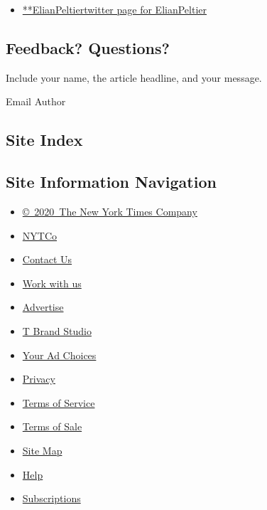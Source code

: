 \begin{itemize}
\tightlist
\item
  \href{https://twitter.com/ElianPeltier}{**ElianPeltiertwitter page for
  ElianPeltier}
\end{itemize}

\hypertarget{feedback-questions}{%
\subsection{Feedback? Questions?}\label{feedback-questions}}

Include your name, the article headline, and your message.

Email Author

\hypertarget{site-index}{%
\subsection{Site Index}\label{site-index}}

\hypertarget{site-information-navigation}{%
\subsection{Site Information
Navigation}\label{site-information-navigation}}

\begin{itemize}
\tightlist
\item
  \href{https://help.nytimes.com/hc/en-us/articles/115014792127-Copyright-notice}{©~2020~The
  New York Times Company}
\end{itemize}

\begin{itemize}
\tightlist
\item
  \href{https://www.nytco.com/}{NYTCo}
\item
  \href{https://help.nytimes.com/hc/en-us/articles/115015385887-Contact-Us}{Contact
  Us}
\item
  \href{https://www.nytco.com/careers/}{Work with us}
\item
  \href{https://nytmediakit.com/}{Advertise}
\item
  \href{http://www.tbrandstudio.com/}{T Brand Studio}
\item
  \href{https://www.nytimes.com/privacy/cookie-policy\#how-do-i-manage-trackers}{Your
  Ad Choices}
\item
  \href{https://www.nytimes.com/privacy}{Privacy}
\item
  \href{https://help.nytimes.com/hc/en-us/articles/115014893428-Terms-of-service}{Terms
  of Service}
\item
  \href{https://help.nytimes.com/hc/en-us/articles/115014893968-Terms-of-sale}{Terms
  of Sale}
\item
  \href{https://spiderbites.nytimes.com}{Site Map}
\item
  \href{https://help.nytimes.com/hc/en-us}{Help}
\item
  \href{https://www.nytimes.com/subscription?campaignId=37WXW}{Subscriptions}
\end{itemize}
